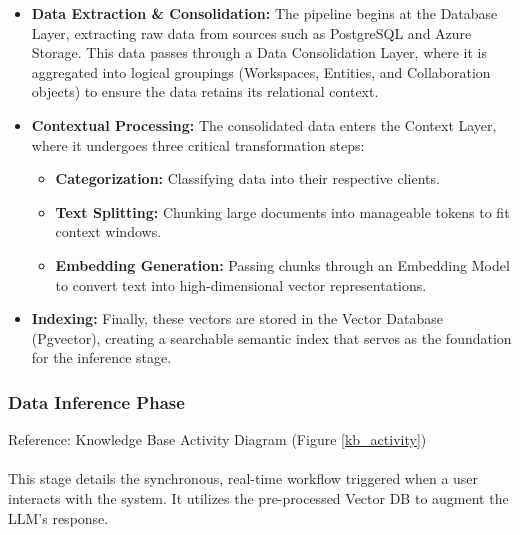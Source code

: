 \begin{itemize}

    \item \textbf{Data Extraction \& Consolidation:} The pipeline begins at the Database Layer, extracting raw data from sources such as PostgreSQL and Azure Storage. This data passes through a Data Consolidation Layer, where it is aggregated into logical groupings (Workspaces, Entities, and Collaboration objects) to ensure the data retains its relational context.

    \item \textbf{Contextual Processing:} The consolidated data enters the Context Layer, where it undergoes three critical transformation steps:
    
    \begin{itemize}
    
    \item \textbf{Categorization:} Classifying data into their respective clients.
    
    \item \textbf{Text Splitting:} Chunking large documents into manageable tokens to fit context windows.
    
    \item \textbf{Embedding Generation:} Passing chunks through an Embedding Model to convert text into high-dimensional vector representations.

    \end{itemize}
    
    \item \textbf{Indexing:} Finally, these vectors are stored in the Vector Database (Pgvector), creating a searchable semantic index that serves as the foundation for the inference stage.

\end{itemize}

\subsubsection{Data Inference Phase}
Reference: Knowledge Base Activity Diagram (Figure \ref{kb_activity})
\\\\
This stage details the synchronous, real-time workflow triggered when a user interacts with the system. It utilizes the pre-processed Vector DB to augment the LLM's response.

